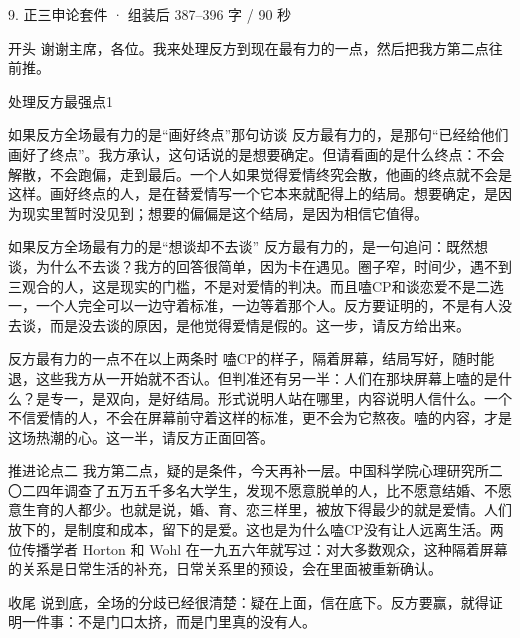 \documentclass[script,pro]{debate}
\begin{document}
\begin{kit}{9. 正三申论}{套件 · 组装后 387–396 字 / 90 秒}
\begin{fixed}{开头}
谢谢主席，各位。我来处理反方到现在最有力的一点，然后把我方第二点往前推。
\end{fixed}
\begin{pick}{处理反方最强点}{1}
\begin{module}{如果反方全场最有力的是“画好终点”那句访谈}
反方最有力的，是那句“已经给他们画好了终点”。我方承认，这句话说的是想要确定。但请看画的是什么终点：不会解散，不会跑偏，走到最后。一个人如果觉得爱情终究会散，他画的终点就不会是这样。画好终点的人，是在替爱情写一个它本来就配得上的结局。想要确定，是因为现实里暂时没见到；想要的偏偏是这个结局，是因为相信它值得。
\end{module}
\begin{module}{如果反方全场最有力的是“想谈却不去谈”}
反方最有力的，是一句追问：既然想谈，为什么不去谈？我方的回答很简单，因为卡在遇见。圈子窄，时间少，遇不到三观合的人，这是现实的门槛，不是对爱情的判决。而且嗑CP和谈恋爱不是二选一，一个人完全可以一边守着标准，一边等着那个人。反方要证明的，不是有人没去谈，而是没去谈的原因，是他觉得爱情是假的。这一步，请反方给出来。
\end{module}
\begin{fallback}{反方最有力的一点不在以上两条时}
嗑CP的样子，隔着屏幕，结局写好，随时能退，这些我方从一开始就不否认。但判准还有另一半：人们在那块屏幕上嗑的是什么？是专一，是双向，是好结局。形式说明人站在哪里，内容说明人信什么。一个不信爱情的人，不会在屏幕前守着这样的标准，更不会为它熬夜。嗑的内容，才是这场热潮的心。这一半，请反方正面回答。
\end{fallback}
\end{pick}
\begin{fixed}{推进论点二}
我方第二点，疑的是条件，今天再补一层。中国科学院心理研究所二〇二四年调查了五万五千多名大学生，发现不愿意脱单的人，比不愿意结婚、不愿意生育的人都少。也就是说，婚、育、恋三样里，被放下得最少的就是爱情。人们放下的，是制度和成本，留下的是爱。这也是为什么嗑CP没有让人远离生活。两位传播学者 Horton 和 Wohl 在一九五六年就写过：对大多数观众，这种隔着屏幕的关系是日常生活的补充，日常关系里的预设，会在里面被重新确认。
\end{fixed}
\begin{fixed}{收尾}
说到底，全场的分歧已经很清楚：疑在上面，信在底下。反方要赢，就得证明一件事：不是门口太挤，而是门里真的没有人。
\end{fixed}
\end{kit}
\end{document}
